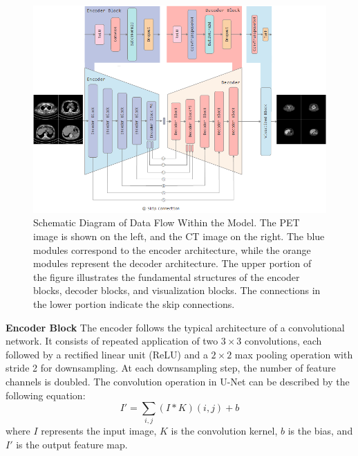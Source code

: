 \documentclass[twocolumn]{article}
\begin{document}
\begin{figure}[t!]
	\centering
	\includegraphics[width=1.0\linewidth]{u-net/lung/Encoder-Decoder-5layer-250406}
	\caption[architecture]{Schematic Diagram of Data Flow Within the Model. The PET image is shown on the left, and the CT image on the right. The blue modules correspond to the encoder architecture, while the orange modules represent the decoder architecture. The upper portion of the figure illustrates the fundamental structures of the encoder blocks, decoder blocks, and visualization blocks. The connections in the lower portion indicate the skip connections.}
	\label{fig:Encoder_Decoder_Pair}
\end{figure}

\textbf{Encoder Block} The encoder follows the typical architecture of a convolutional network. It consists of repeated application of two $3\times3$ convolutions, each followed by a rectified linear unit (ReLU) and a $2\times2$ max pooling operation with stride 2 for downsampling. At each downsampling step, the number of feature channels is doubled. The convolution operation in U-Net can be described by the following equation:
\[
	I' = \sum_{i,j} (I * K)(i,j) + b
\]
where \(I\) represents the input image, \(K\) is the convolution kernel, \(b\) is the bias, and \(I'\) is the output feature map.


\end{document}

